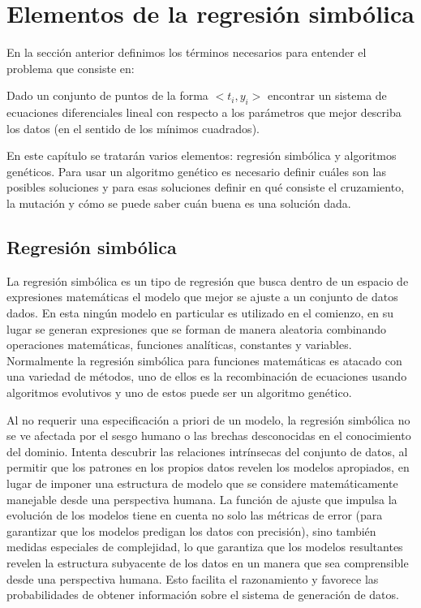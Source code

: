 \chapter{Elementos de la regresión simbólica}\label{chapter:symbolic_regression}

En la sección anterior definimos los términos necesarios para entender el problema que consiste en:

Dado un conjunto de puntos de la forma $<t_i, y_i>$ encontrar un sistema de ecuaciones diferenciales lineal con respecto a los parámetros que mejor describa los datos (en el sentido de los mínimos cuadrados).

En este capítulo se tratarán varios elementos: regresión simbólica y algoritmos genéticos.  Para usar un algoritmo genético es necesario definir cuáles son las posibles soluciones y para esas soluciones definir en qué consiste el cruzamiento, la mutación y cómo se puede saber cuán buena es una solución dada.

\section{Regresión simbólica}

La regresión simbólica es un tipo de regresión que busca dentro de un espacio de expresiones matemáticas el modelo que mejor se ajuste a un conjunto de datos dados. En esta ningún modelo en particular es utilizado en el comienzo, en su lugar se generan expresiones que se forman de manera aleatoria combinando operaciones matemáticas, funciones analíticas, constantes y variables. Normalmente la regresión simbólica para funciones matemáticas es atacado con una variedad de métodos, uno de ellos es la recombinación de ecuaciones usando algoritmos evolutivos y uno de estos puede ser un algoritmo genético.

Al no requerir una especificación a priori de un modelo, la regresión simbólica no se ve afectada por el sesgo humano o las brechas desconocidas en el conocimiento del dominio. Intenta descubrir las relaciones intrínsecas del conjunto de datos, al permitir que los patrones en los propios datos revelen los modelos apropiados, en lugar de imponer una estructura de modelo que se considere matemáticamente manejable desde una perspectiva humana. La función de ajuste que impulsa la evolución de los modelos tiene en cuenta no solo las métricas de error (para garantizar que los modelos predigan los datos con precisión), sino también medidas especiales de complejidad, lo que garantiza que los modelos resultantes revelen la estructura subyacente de los datos en un manera que sea comprensible desde una perspectiva humana. Esto facilita el razonamiento y favorece las probabilidades de obtener información sobre el sistema de generación de datos.

